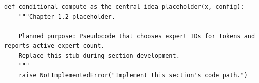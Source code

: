 \begin{lstlisting}[style=bookpython,caption={Planned code placeholder for conditional compute as the central idea.},label={lst:ch01-conditional-compute-as-the-central-idea}]
def conditional_compute_as_the_central_idea_placeholder(x, config):
    """Chapter 1.2 placeholder.

    Planned purpose: Pseudocode that chooses expert IDs for tokens and reports active expert count.
    Replace this stub during section development.
    """
    raise NotImplementedError("Implement this section's code path.")
\end{lstlisting}
